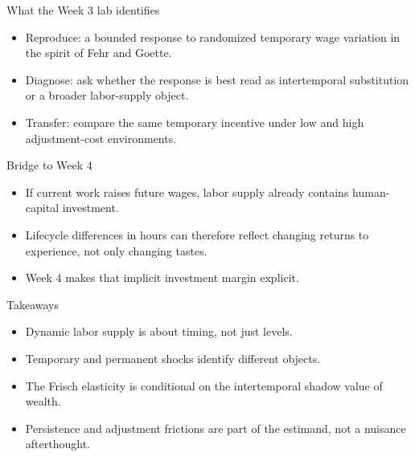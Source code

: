 \documentclass[aspectratio=169,11pt]{beamer}
\begin{document}
\begin{frame}{What the Week 3 lab identifies}
\begin{itemize}
    \item Reproduce: a bounded response to randomized temporary wage variation in the spirit of Fehr and Goette.
    \item Diagnose: ask whether the response is best read as intertemporal substitution or a broader labor-supply object.
    \item Transfer: compare the same temporary incentive under low and high adjustment-cost environments.
\end{itemize}
\end{frame}

\begin{frame}{Bridge to Week 4}
\begin{itemize}
    \item If current work raises future wages, labor supply already contains human-capital investment.
    \item Lifecycle differences in hours can therefore reflect changing returns to experience, not only changing tastes.
    \item Week 4 makes that implicit investment margin explicit.
\end{itemize}
\end{frame}

\begin{frame}{Takeaways}
\begin{itemize}
    \item Dynamic labor supply is about timing, not just levels.
    \item Temporary and permanent shocks identify different objects.
    \item The Frisch elasticity is conditional on the intertemporal shadow value of wealth.
    \item Persistence and adjustment frictions are part of the estimand, not a nuisance afterthought.
\end{itemize}
\end{frame}
\end{document}
